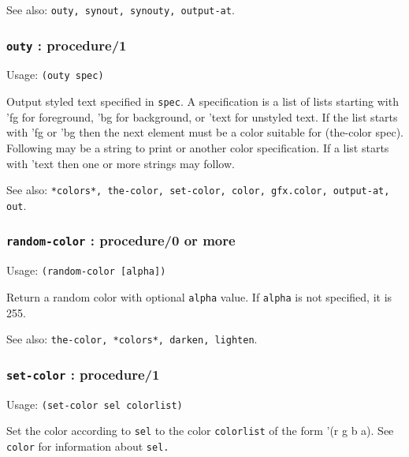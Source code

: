 \documentclass[
]{article}
\newcommand{\passthrough}[1]{#1}
\begin{document}
See also: \passthrough{\lstinline!outy, synout, synouty, output-at!}.

\hypertarget{outy-procedure1}{%
\subsubsection{\texorpdfstring{\texttt{outy} :
procedure/1}{outy : procedure/1}}\label{outy-procedure1}}

Usage: \passthrough{\lstinline!(outy spec)!}

Output styled text specified in \passthrough{\lstinline!spec!}. A
specification is a list of lists starting with 'fg for foreground, 'bg
for background, or 'text for unstyled text. If the list starts with 'fg
or 'bg then the next element must be a color suitable for (the-color
spec). Following may be a string to print or another color
specification. If a list starts with 'text then one or more strings may
follow.

See also:
\passthrough{\lstinline!*colors*, the-color, set-color, color, gfx.color, output-at, out!}.

\hypertarget{random-color-procedure0-or-more}{%
\subsubsection{\texorpdfstring{\texttt{random-color} : procedure/0 or
more}{random-color : procedure/0 or more}}\label{random-color-procedure0-or-more}}

Usage: \passthrough{\lstinline!(random-color [alpha])!}

Return a random color with optional \passthrough{\lstinline!alpha!}
value. If \passthrough{\lstinline!alpha!} is not specified, it is 255.

See also:
\passthrough{\lstinline!the-color, *colors*, darken, lighten!}.

\hypertarget{set-color-procedure1}{%
\subsubsection{\texorpdfstring{\texttt{set-color} :
procedure/1}{set-color : procedure/1}}\label{set-color-procedure1}}

Usage: \passthrough{\lstinline!(set-color sel colorlist)!}

Set the color according to \passthrough{\lstinline!sel!} to the color
\passthrough{\lstinline!colorlist!} of the form '(r g b a). See
\passthrough{\lstinline!color!} for information about
\passthrough{\lstinline!sel.!}
\end{document}
